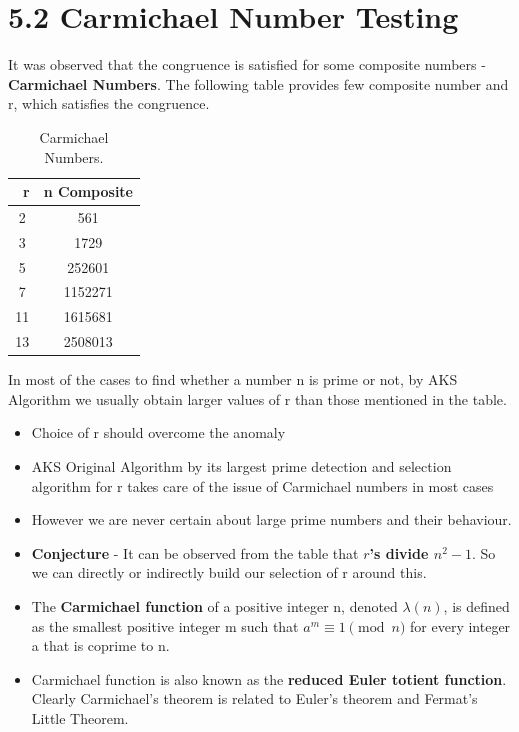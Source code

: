 \documentclass[a4paper,12pt]{article}
\begin{document}
\newpage
{}
\section*{\large 5.2 Carmichael Number Testing}

It was observed that the congruence is satisfied for some composite numbers - \textbf{Carmichael Numbers}. The following table provides few composite number and r, which satisfies the congruence.

\begin{table}[h!]
	\centering
	\caption{Carmichael Numbers.}
	\label{tab:table1}
	\vspace{0.1in}
	\begin{tabular}{|c|c|}
		\hline
		\ r & n Composite \\
		\hline
		2 & 561 \\
		3 & 1729 \\
		5 & 252601 \\
		7 & 1152271 \\
		11 & 1615681 \\
		13 & 2508013 \\
		\hline
	\end{tabular}
\end{table}

\begin{flushleft}
	In most of the cases to find whether a number n is prime or not, by AKS Algorithm we usually obtain larger values of r than those mentioned in the table.
\end{flushleft}

\begin{itemize}
	\setlength{\itemindent}{.1in}
	\item Choice of r should overcome the anomaly
	\item AKS Original Algorithm by its largest prime detection and selection algorithm for r takes care of the issue of Carmichael numbers in most cases
	\item However we are never certain about large prime numbers and their behaviour.
	\item \textbf{Conjecture} - It can be observed from the table that \textbf{\(r\)'s divide \(n^2 - 1\)}. So we can directly or indirectly build our selection of r around this.
	\item The \textbf{Carmichael function} of a positive integer n, denoted \(\lambda(n)\), is defined as the smallest positive integer m such that \(a^m \equiv 1 \pmod{n}\) for every integer a that is coprime to n.
	\item Carmichael function is also known as the \textbf{reduced Euler totient function}. Clearly Carmichael's theorem is related to Euler's theorem and Fermat's Little Theorem.
\end{itemize}
\end{document}
